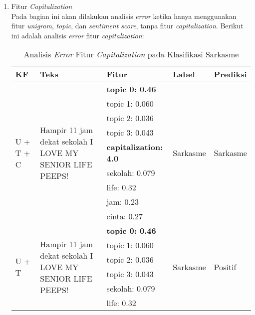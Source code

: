 \begin{enumerate}[leftmargin=*,nolistsep]
	\item Fitur \textit{Capitalization}\\
	Pada bagian ini akan dilakukan analisis \textit{error} ketika hanya menggunakan fitur \textit{unigram}, \textit{topic}, dan \textit{sentiment score}, tanpa fitur \textit{capitalization}. Berikut ini adalah analisis \textit{error} fitur \textit{capitalization}:
		\begin{table}[H]
			\caption{Analisis \textit{Error} Fitur \textit{Capitalization} pada Klasifikasi Sarkasme}
			\centering
			\small
			\begin{adjustbox}{width=1\textwidth}
				\begin{tabular}{|p{1.65cm}|p{3.15cm}|p{3.45cm}|p{1.45cm}|p{1.45cm}|}
					\hline
					\textbf{KF} & \textbf{Teks} & \textbf{Fitur} & \textbf{Label} & \textbf{Prediksi} \\
					\hline
					\multirow{9}{*}{\parbox{1.65cm}{U + T + C}}& \multirow{9}{*}{\parbox{3.15cm}{Hampir 11 jam dekat sekolah I LOVE MY SENIOR LIFE PEEPS!}} & \textbf{topic 0: 0.46} 
					& \multirow{9}{*}{\parbox{1.45cm}{Sarkasme}} & \multirow{9}{*}{\parbox{1.45cm}{Sarkasme}} \\
					\cline{3-3}
					& & topic 1: 0.060 & & \\
					\cline{3-3}
					& & topic 2: 0.036 & & \\
					\cline{3-3}
					& & topic 3: 0.043 & & \\
					\cline{3-3}
					& & \textbf{capitalization: 4.0} & & \\
					\cline{3-3}
					& & sekolah: 0.079 & & \\
					\cline{3-3}
					& & life: 0.32 & & \\
					\cline{3-3}
					& & jam: 0.23 & & \\
					\cline{3-3}
					& & cinta: 0.27 & & \\
					\hline
					\multirow{8}{*}{\parbox{1.65cm}{U + T}} & \multirow{8}{*}{\parbox{3.15cm}{Hampir 11 jam dekat sekolah I LOVE MY SENIOR LIFE PEEPS!}} & \textbf{topic 0: 0.46} & \multirow{8}{*}{\parbox{1.45cm}{Sarkasme}} & \multirow{8}{*}{\parbox{1.45cm}{Positif}} \\
					\cline{3-3}
					& & topic 1: 0.060 & & \\
					\cline{3-3}
					& & topic 2: 0.036 & & \\
					\cline{3-3}
					& & topic 3: 0.043 & & \\
					\cline{3-3}
					& & sekolah: 0.079 & & \\
					\cline{3-3}
					& & life: 0.32 & & \\

\end{tabular}
\end{adjustbox}
\end{table}
\end{enumerate}
